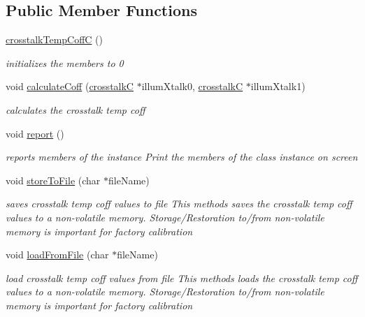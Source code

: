 \subsection*{Public Member Functions}
\begin{DoxyCompactItemize}
\item 
\mbox{\hyperlink{class_o_p_t3101_1_1crosstalk_temp_coff_c_a3e910a6053a8cbffb8d18868ade903b5}{crosstalk\+Temp\+CoffC}} ()
\begin{DoxyCompactList}\small\item\em initializes the members to 0 \end{DoxyCompactList}\item 
void \mbox{\hyperlink{class_o_p_t3101_1_1crosstalk_temp_coff_c_a21c8e56e8f2b313d3f89c6e989a8aee2}{calculate\+Coff}} (\mbox{\hyperlink{class_o_p_t3101_1_1crosstalk_c}{crosstalkC}} $\ast$illum\+Xtalk0, \mbox{\hyperlink{class_o_p_t3101_1_1crosstalk_c}{crosstalkC}} $\ast$illum\+Xtalk1)
\begin{DoxyCompactList}\small\item\em calculates the crosstalk temp coff \end{DoxyCompactList}\item 
void \mbox{\hyperlink{class_o_p_t3101_1_1crosstalk_temp_coff_c_a881ec5ebe971af6c4c4f50e143d64f9a}{report}} ()
\begin{DoxyCompactList}\small\item\em reports members of the instance Print the members of the class instance on screen \end{DoxyCompactList}\item 
void \mbox{\hyperlink{class_o_p_t3101_1_1crosstalk_temp_coff_c_aa24b81ff4f56b9f0f832b57086c87eb8}{store\+To\+File}} (char $\ast$file\+Name)
\begin{DoxyCompactList}\small\item\em saves crosstalk temp coff values to file This methods saves the crosstalk temp coff values to a non-\/volatile memory. Storage/\+Restoration to/from non-\/volatile memory is important for factory calibration \end{DoxyCompactList}\item 
void \mbox{\hyperlink{class_o_p_t3101_1_1crosstalk_temp_coff_c_ae7028582197d0c77e9cf990dab888f1e}{load\+From\+File}} (char $\ast$file\+Name)
\begin{DoxyCompactList}\small\item\em load crosstalk temp coff values from file This methods loads the crosstalk temp coff values to a non-\/volatile memory. Storage/\+Restoration to/from non-\/volatile memory is important for factory calibration \end{DoxyCompactList}\end{DoxyCompactItemize}
